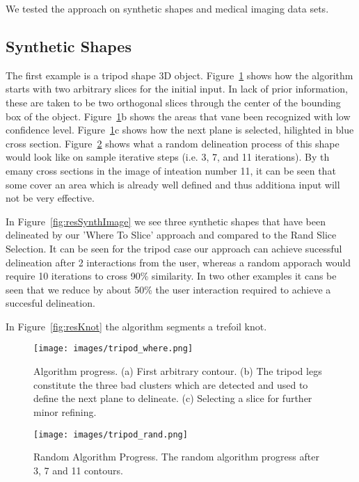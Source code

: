 We tested the approach on synthetic shapes and medical imaging data sets.

\subsection{Synthetic Shapes}
The first example is a tripod shape 3D object. Figure~\ref{fig:tripodWhereImage} shows how the algorithm starts with two arbitrary slices for the initial input. In lack of prior information, these are taken to be two orthogonal slices through the center of the bounding box of the object. Figure~\ref{fig:tripodWhereImage}b shows the areas that vane been recognized with low confidence level. Figure~\ref{fig:tripodWhereImage}c shows how the next plane is selected, hilighted in blue cross section. Figure~\ref{fig:tripodRandImage} shows what a random delineation process of this shape would look like on sample iterative steps (i.e. 3, 7, and 11 iterations). By th emany cross sections in the image of inteation number 11, it can be seen that some cover an area which is already well defined and thus additiona input will not be very effective. 

In Figure~\ref{fig:resSynthImage} we see three synthetic shapes that have been delineated by our 'Where To Slice' approach and compared to the Rand Slice Selection. It can be seen for the tripod case our approach can achieve sucessful delineation after 2 interactions from the user, whereas a random apporach would require 10 iterations to cross 90\% similarity. In two other examples it cans be seen that we reduce by about 50\% the user interaction required to achieve a succesful delineation.

In Figure~\ref{fig:resKnot} the algorithm segments a trefoil knot.


\begin{figure}[htb]
\centering
  \texttt{[image: images/tripod\_where.png]}
  \caption[Algorithm Progress]{
 Algorithm progress.
 (a) First arbitrary contour.
 (b) The tripod legs constitute the three bad clusters which are detected and used to define the next plane to delineate.
 (c) Selecting a slice for further minor refining.} \label{fig:tripodWhereImage}
\end{figure}

\begin{figure}[htb]
\centering
  \texttt{[image: images/tripod\_rand.png]}
  \caption[Random Algorithm Progress]{
  Random Algorithm Progress.
  The random algorithm progress after 3, 7 and 11 contours.}\label{fig:tripodRandImage}
\end{figure}


